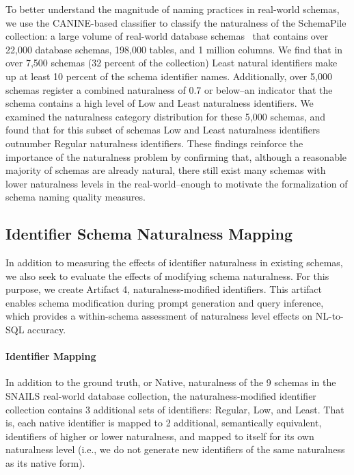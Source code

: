 To better understand the magnitude of naming practices in real-world schemas,
we use the CANINE-based classifier to classify the naturalness of the SchemaPile collection: a large volume of real-world database schemas~\cite{doehmen2024schemapile} that contains over 22,000 database schemas, 198,000 tables, and 1 million columns.
We find that in over 7,500 schemas (32 percent of the collection) Least natural identifiers make up at least 10 percent of the schema identifier names.
Additionally, over 5,000 schemas register a combined naturalness of 0.7 or below--an indicator that the schema contains a high level of Low and Least naturalness identifiers.
We examined the naturalness category distribution for these 5,000 schemas, and found that for this subset of schemas Low and Least naturalness identifiers outnumber Regular naturalness identifiers.
These findings reinforce the importance of the naturalness problem by confirming that, although a reasonable majority of schemas are already natural, there still exist many schemas with lower naturalness levels in the real-world--enough to motivate the formalization of schema naming quality measures.


\subsection{Identifier Schema Naturalness Mapping}
\label{subsection:naturalnessmapping}

In addition to measuring the effects of identifier naturalness in existing schemas, we also seek to evaluate the effects of modifying schema naturalness.
For this purpose, we create Artifact 4, naturalness-modified identifiers.
This artifact enables schema modification during prompt generation and query inference, which provides a within-schema assessment of naturalness level effects on NL-to-SQL accuracy.

\paragraph{\textbf{Identifier Mapping}}
In addition to the ground truth, or Native, naturalness of the 9 schemas in the SNAILS real-world database collection, the naturalness-modified identifier collection contains 3 additional sets of identifiers: Regular, Low, and Least.
That is, each native identifier is mapped to 2 additional, semantically equivalent, identifiers of higher or lower naturalness, and mapped to itself for its own naturalness level (i.e., we do not generate new identifiers of the same naturalness as its native form).



